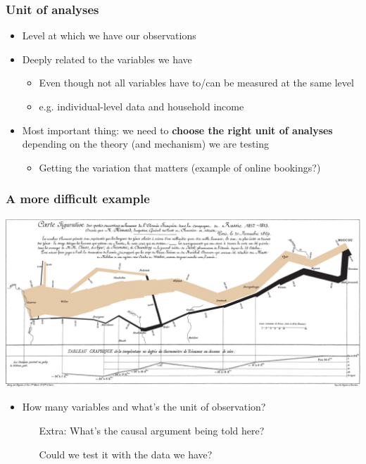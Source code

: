 \documentclass[aspectratio=43]{beamer}
\begin{document}
\begin{frame}
\frametitle{Unit of analyses}
\centering

\begin{itemize}
  \item Level at which we have our observations
  \item Deeply related to the variables we have
  \begin{itemize}
    \item Even though not all variables have to/can be measured at the same level
    \item<2-> e.g. individual-level data and household income
  \end{itemize}
  \item<3-> Most important thing: we need to \textbf{choose the right unit of analyses} depending on the theory (and mechanism) we are testing
  \begin{itemize}
    \item Getting the variation that matters (example of online bookings?)
  \end{itemize}
\end{itemize}


\end{frame}

\begin{frame}
\frametitle{A more difficult example}
\centering

\includegraphics[width = \textwidth]{../img/Minard}

\vspace{10pt}

\begin{itemize}\footnotesize
  \item How many variables and what's the unit of observation?
  \begin{itemize}
    \item[Extra:] What's the causal argument being told here?
    \item[] Could we test it with the data we have?
  \end{itemize}
\end{itemize}

\end{frame}
\end{document}
